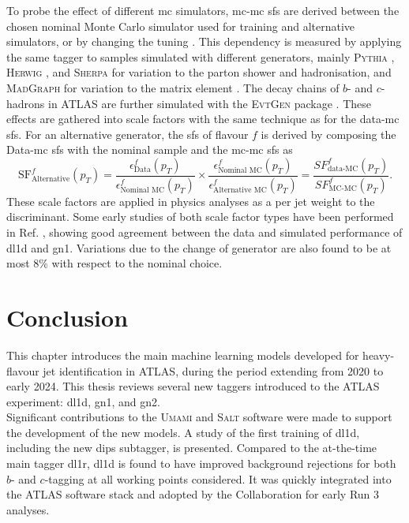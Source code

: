 To probe the effect of different \gls{mc} simulators, \gls{mc}-\gls{mc} \glspl{sf} are derived between the chosen nominal Monte Carlo simulator used for training and alternative simulators, or by changing the tuning \cite{ATL-PHYS-PUB-2020-009}. This dependency is measured by applying the same tagger to samples simulated with different generators, mainly \textsc{Pythia} \cite{SJOSTRAND2015159}, \textsc{Herwig} \cite{bellm2017herwig}, and \textsc{Sherpa} \cite{sherpa2.2paper} for variation to the parton shower and hadronisation, and \textsc{MadGraph} for variation to the matrix element \cite{madgraph}. The decay chains of $b$- and $c$-hadrons in ATLAS are further simulated with the \textsc{EvtGen} package \cite{LANGE2001152}. These effects are gathered into scale factors with the same technique as for the data-\gls{mc} \glspl{sf}. For an alternative generator, the \glspl{sf} of flavour $f$ is derived by composing the Data-\gls{mc} \glspl{sf} with the nominal sample and the \gls{mc}-\gls{mc} \glspl{sf} as \[\textrm{SF}^f_{\textrm{Alternative}}(p_T) = \frac{\epsilon^f_{\textrm{Data}}(p_T)}{\epsilon^f_{\textrm{Nominal MC}}(p_T)} \times \frac{\epsilon^f_{\textrm{Nominal MC}}(p_T)}{\epsilon^f_{\textrm{Alternative MC}}(p_T)} = \frac{SF^f_{\textrm{data-MC}}(p_T)}{SF^f_{\textrm{MC-MC}}(p_T)}.\] These scale factors are applied in physics analyses as a per jet weight to the discriminant. Some early studies of both scale factor types have been performed in Ref. \cite{ATL-PLOT-FTAG-2023-01}, showing good agreement between the data and simulated performance of \gls{dl1d} and \gls{gn1}. Variations due to the change of generator are also found to be at most 8\% with respect to the nominal choice.

\section{Conclusion}
This chapter introduces the main machine learning models developed for heavy-flavour jet identification in ATLAS, during the period extending from 2020 to early 2024. This thesis reviews several new taggers introduced to the ATLAS experiment: \gls{dl1d}, \gls{gn1}, and \gls{gn2}. \\

Significant contributions to the \textsc{Umami} \cite{UmamiCite} and \textsc{Salt} \cite{SaltCite} software were made to support the development of the new models. A study of the first training of \gls{dl1d}, including the new \gls{dips} subtagger, is presented. Compared to the at-the-time main tagger \gls{dl1r}, \gls{dl1d} is found to have improved background rejections for both $b$- and $c$-tagging at all working points considered. It was quickly integrated into the ATLAS software stack and adopted by the Collaboration for early Run 3 analyses. \\

